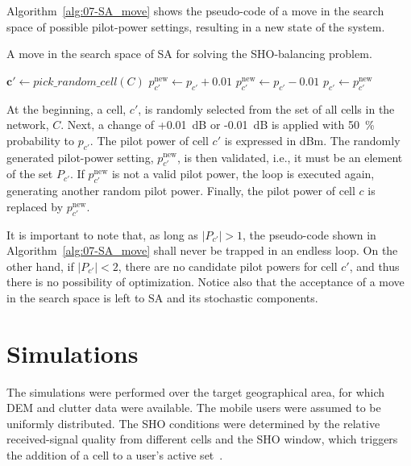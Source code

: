 Algorithm~\ref{alg:07-SA_move} shows the pseudo-code of a move in
the search space of possible pilot-power settings, resulting in a
new state of the system.

\begin{algorithm}
\centering

\caption{A move in the search space of SA for solving the SHO-balancing problem.\label{alg:07-SA_move}}


\begin{algorithmic}
\State $\mathbf{c'} \gets pick\_random\_cell(C)$
\Repeat
		\State $p_{c'}^{\mathrm{new}} \gets p_{c'}+0.01$
	\Else
		\State $p_{c'}^{\mathrm{new}} \gets p_{c'}-0.01$
	\EndIf
{}
\State $p_{c'} \gets p_{c'}^{\mathrm{new}}$
\end{algorithmic}
\end{algorithm}


At the beginning, a cell, $c'$, is randomly selected from the set
of all cells in the network, $C$. Next, a change of +0.01~dB or
-0.01~dB is applied with 50~\% probability to $p_{c'}$. The pilot
power of cell $c'$ is expressed in dBm. The randomly generated pilot-power
setting, $p_{c'}^{\mathrm{new}}$, is then validated, i.e., it must
be an element of the set $P_{c'}$. If $p_{c'}^{\mathrm{new}}$ is
not a valid pilot power, the loop is executed again, generating another
random pilot power. Finally, the pilot power of cell $c$ is replaced
by $p_{c'}^{\mathrm{new}}$.

It is important to note that, as long as $|P_{c'}|>1$, the pseudo-code
shown in Algorithm~\ref{alg:07-SA_move} shall never be trapped in
an endless loop. On the other hand, if $|P_{c'}|<2$, there are no
candidate pilot powers for cell $c'$, and thus there is no possibility
of optimization. Notice also that the acceptance of a move in the
search space is left to SA and its stochastic components.


\section{Simulations \label{sec:07-Simulations}}

The simulations were performed over the target geographical area,
for which DEM and clutter data were available. The mobile users were
assumed to be uniformly distributed. The SHO conditions were determined
by the relative received-signal quality from different cells and the
SHO window, which triggers the addition of a cell to a user's active
set~\cite{WCDMAforUMTS_RadioAccessForThirdGenerationMobileCommunications}.


